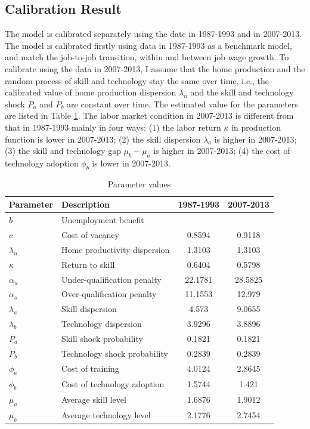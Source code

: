 \documentclass[12pt]{article}
\newcommand{\1}{\mathbb{1}}
\begin{document}
\subsection{Calibration Result}
The model is calibrated separately using the date in 1987-1993 and in 2007-2013. The model is calibrated firstly using data in 1987-1993 as a benchmark model, and match the job-to-job transition, within and between job wage growth. To calibrate using the data in 2007-2013, I assume that the home production and the random process of skill and technology stay the same over time, i.e., the calibrated value of home production dispersion $\lambda_n$ and the skill and technology shock $P_a$ and $P_b$ are constant over time. The estimated value for the parameters are listed in Table \ref{Parameter}. The labor market condition in 2007-2013 is different from that in 1987-1993 mainly in four ways: (1) the labor return $\kappa$ in production function is lower in 2007-2013; (2) the skill dispersion $\lambda_a$ is higher in 2007-2013; (3) the skill and technology gap $\mu_b-\mu_a$ is higher in 2007-2013; (4) the cost of technology adoption $\phi_b$ is lower in 2007-2013. 

\begin{table}[h!]
\scriptsize
\begin{center}
\begin{tabular}{ll|cc}
\hline \hline
Parameter     &       Description         & 1987-1993    & 2007-2013                \\
\hline 
$b$ & Unemployment benefit & & \\
$c$ & Cost of vacancy & 0.8594 & 0.9118 \\
$\lambda_n$& Home productivity dispersion & 1.3103  & 1.3103 \\
$\kappa$ & Return to skill & 0.6404  & 0.5798    \\
$\alpha_u$ & Under-qualification penalty & 22.1781  & 28.5825 \\
$\alpha_o$ & Over-qualification penalty & 11.1553 & 12.979 \\
$\lambda_a$ & Skill dispersion & 4.573   & 9.0655   \\
$\lambda_b$ & Technology dispersion & 3.9296       & 3.8896       \\
$P_a$ & Skill shock probability & 0.1821  & 0.1821   \\
$P_b$ & Technology shock probability & 0.2839	  & 0.2839   \\
$\phi_a$ & Cost of training & 4.0124  & 2.8645   \\
$\phi_b$ & Cost of technology adoption & 1.5744  & 1.421  \\
$\mu_a$ & Average skill level & 1.6876  & 1.9012   \\
$\mu_b$ & Average technology level  & 2.1776  & 2.7454 \\
\hline 
\end{tabular}
\end{center}
\caption{Parameter values}
\label{Parameter}
\end{table}
\end{document}
